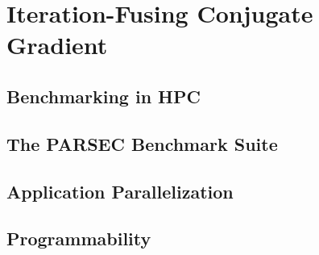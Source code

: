 
\chapter{Iteration-Fusing Conjugate Gradient}
\label{chap:ifcg}

\newcommand{\MAXPERF}{42\%}
\newcommand{\AVERAGEPERF}{13\%}
\newcommand{\MAXLOC}{81\%}
\newcommand{\AVERAGELOC}{28\%}



\section{Benchmarking in HPC}
\label{sec:hpc_benchmarking}

\section{The PARSEC Benchmark Suite}
\label{sec:parsec}

\label{sec:parsecss_implementation}
\section{Application Parallelization}

\section{Programmability}


